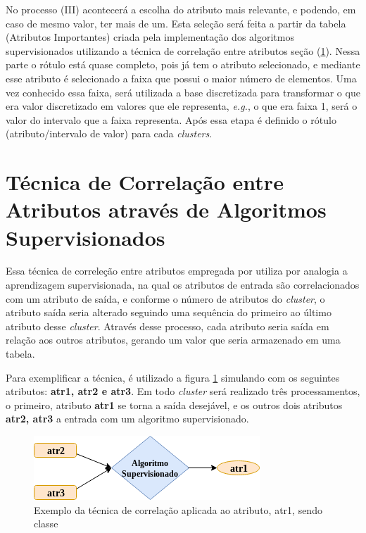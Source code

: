 No processo (III) acontecerá a escolha do atributo mais relevante, e podendo, em caso de mesmo valor, ter mais de um. Esta seleção será feita a partir da tabela (Atributos Importantes) criada pela implementação dos algoritmos supervisionados utilizando a técnica de correlação entre atributos seção (\ref{cap:ferramentas:sec:tecnica}). Nessa parte o rótulo está quase completo, pois já tem o atributo selecionado, e mediante esse atributo é selecionado a faixa que possui o maior número de elementos. Uma vez conhecido essa faixa, será utilizada a base discretizada para transformar o que era valor discretizado em valores que ele representa, \textit{e.g.}, o que era faixa 1, será o valor do intervalo que a faixa representa. Após essa etapa é definido o rótulo (atributo/intervalo de valor) para cada \textit{clusters}. 

\section{Técnica de Correlação entre Atributos através de Algoritmos Supervisionados}\label{cap:ferramentas:sec:tecnica}

Essa técnica de correleção entre atributos empregada por \cite{Lopes2016} utiliza por analogia a aprendizagem supervisionada, na qual os atributos de entrada são correlacionados com um atributo  de saída, e conforme o número de atributos do \textit{cluster}, o atributo saída seria alterado seguindo uma sequência do primeiro ao último atributo desse \textit{cluster}. Através desse processo, cada atributo seria saída em relação aos outros atributos, gerando um valor que seria armazenado em uma tabela. 

Para exemplificar a técnica, é utilizado a figura \ref{fig:tecnicamodelo} simulando com os seguintes atributos: \textbf{atr1, atr2 e atr3}. Em todo \textit{cluster} será realizado três processamentos, o primeiro, atributo \textbf{atr1} se torna a saída desejável, e os outros dois atributos \textbf{atr2, atr3} a entrada com um algoritmo supervisionado.

\begin{figure}[h!]
        \centering
        \includegraphics[scale=0.7]{figs/tecnicamodelo.png}
        \caption{Exemplo da técnica de correlação aplicada ao atributo, atr1, sendo classe } \label{fig:tecnicamodelo}
\end{figure}

